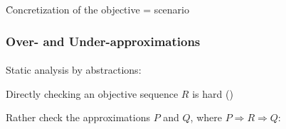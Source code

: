 \begin{frame}[t]
\begin{columns}
\begin{column}{0.45\textwidth}
\end{column}
\end{columns}

\medskip
\begin{center}
\f Concretization of the objective = scenario

\end{center}
\end{frame}



\begin{frame}
  \frametitle{Over- and Under-approximations}
  \framesubtitle{\tcite{\citepmrmscs}}

Static analysis by abstractions:
\begin{fleches}
  \item Directly checking an objective sequence $R$ is hard ()
  \item Rather check the approximations $P$ and $Q$, where $P \Rightarrow R \Rightarrow Q$:
\end{fleches}

\begin{center}
\scalebox{0.7}{
  \figsa
}
\end{center}

\end{frame}
